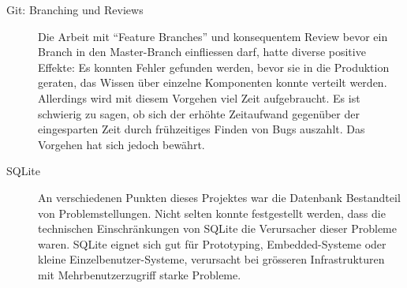 \begin{description}
	\item[Git: Branching und Reviews] Die Arbeit mit \enquote{Feature Branches} und
	konsequentem Review bevor ein Branch in den Master-Branch einfliessen darf,
	hatte diverse positive Effekte: Es konnten Fehler gefunden werden, bevor sie in
	die Produktion geraten, das Wissen über einzelne Komponenten konnte verteilt
	werden. Allerdings wird mit diesem Vorgehen viel Zeit aufgebraucht. Es ist schwierig
	zu sagen, ob sich der erhöhte Zeitaufwand gegenüber der eingesparten Zeit
	durch frühzeitiges Finden von Bugs auszahlt. Das Vorgehen hat sich jedoch
	bewährt.
	
	\item[SQLite] An verschiedenen Punkten dieses Projektes war die Datenbank
	Bestandteil von Problemstellungen. Nicht selten konnte festgestellt werden,
	dass die technischen Einschränkungen von SQLite die Verursacher dieser Probleme
	waren. SQLite eignet sich gut für Prototyping, Embedded-Systeme oder kleine
	Einzelbenutzer-Systeme, verursacht bei grösseren Infrastrukturen mit
	Mehrbenutzerzugriff starke Probleme.
	
\end{description}

